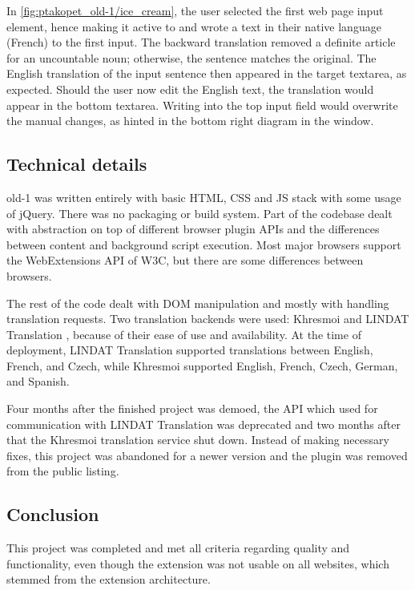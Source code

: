 In \cref{fig:ptakopet_old-1/ice_cream}, the user selected the first web page input element, hence making it active to \ptakopet{} and wrote a text in their native language (French) to the first \ptakopet{} input. The backward translation removed a definite article for an uncountable noun; otherwise, the sentence matches the original. The English translation of the input sentence then appeared in the target textarea, as expected. Should the user now edit the English text, the translation would appear in the bottom \ptakopet{} textarea. Writing into the top \ptakopet{} input field would overwrite the manual changes, as hinted in the bottom right diagram in the \ptakopet{} window.

\pagebreak 

\subsection{Technical details}

\ptakopet{} old-1 was written entirely with basic HTML, CSS and JS stack with some usage of jQuery. There was no packaging or build system. Part of the codebase dealt with abstraction on top of different browser plugin APIs and the differences between content and background script execution. Most major browsers support the WebExtensions API of W3C, but there are some differences between browsers.

The rest of the code dealt with DOM manipulation and mostly with handling translation requests. Two translation backends were used: Khresmoi \citep{khresmoi} and LINDAT Translation \citep{popel-en-cs}, because of their ease of use and availability. At the time of deployment, LINDAT Translation supported translations between English, French, and Czech, while Khresmoi supported English, French, Czech, German, and Spanish.

Four months after the finished project was demoed, the API which \ptakopet{} used for communication with LINDAT Translation was deprecated and two months after that the Khresmoi translation service shut down. Instead of making necessary fixes, this project was abandoned for a newer version and the plugin was removed from the public listing.

\subsection{Conclusion}

This project was completed and met all criteria regarding quality and functionality, even though the extension was not usable on all websites, which stemmed from the extension architecture.

